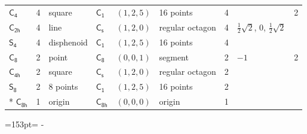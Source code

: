\documentclass[10pt,a4paper]{article}
\newcommand{\needspace}[1]{\par\penalty-100\begingroup\dimen0=#1\relax\dimen2=\pagegoal
  \advance\dimen2-\pagetotal\ifdim\dimen0>\dimen2\relax\ifdim\dimen2>0pt\vfil\break\fi\fi
  \endgroup}
\numberwithin{equation}{section}
\newcommand{\grp}[1]{\mathsf{#1}}
\newlength{\fillwidth}\newlength{\cellwidth}\newlength{\colwidth}
\begin{document}
{{\begin{longtable}{@{}lrllllr>{\RaggedRight\arraybackslash}p{\fillwidth}r@{}}
\href{C4.pdf}{$\grp{C_{4}}$} & 4 & square & \href{C1.pdf}{$\grp{C_{1}}$} & $(1, 2, 5)$ & 16 points & 4 &  & 2\\
\href{C2h.pdf}{$\grp{C_{2h}}$} & 4 & line & \href{C1v.pdf}{$\grp{C_{s}}$} & $(1, 2, 0)$ & regular octagon & 4 & ${\tfrac{1}{2}\sqrt{2}}$, ${0}$, ${\tfrac{1}{2}\sqrt{2}}$ & \\
\href{S4.pdf}{$\grp{S_{4}}$} & 4 & disphenoid & \href{C1.pdf}{$\grp{C_{1}}$} & $(1, 2, 5)$ & 16 points & 4 &  & \\
\href{C8.pdf}{$\grp{C_{8}}$} & 2 & point & \href{C8.pdf}{$\grp{C_{8}}$} & $(0, 0, 1)$ & segment & 2 & ${-1}$ & 2\\
\href{C4h.pdf}{$\grp{C_{4h}}$} & 2 & square & \href{C1v.pdf}{$\grp{C_{s}}$} & $(1, 2, 0)$ & regular octagon & 2 &  & \\
\href{S8.pdf}{$\grp{S_{8}}$} & 2 & 8 points & \href{C1.pdf}{$\grp{C_{1}}$} & $(1, 2, 5)$ & 16 points & 2 &  & \\*
\href{C8h.pdf}{$\grp{C_{8h}}$} & 1 & origin & \href{C8h.pdf}{$\grp{C_{8h}}$} & $(0, 0, 0)$ & origin & 1 &  & \\
\bottomrule\end{longtable}}}
\needspace{153pt}
\end{document}
